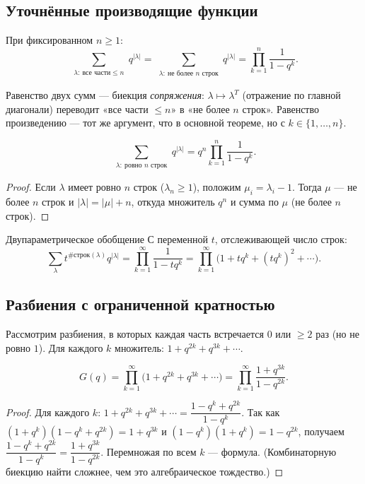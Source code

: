\subsection{Уточнённые производящие функции}

\begin{Theorem}{}{}
	При фиксированном $n\ge 1$:
	\[
	\sum_{\substack{\lambda:\ \text{все части}\le n}}q^{|\lambda|}
	=\sum_{\substack{\lambda:\ \text{не более }n\text{ строк}}}q^{|\lambda|}
	=\prod_{k=1}^{n}\frac{1}{1-q^k}.
	\]
\end{Theorem}

Равенство двух сумм — биекция \emph{сопряжения}: $\lambda\mapsto\lambda^{T}$ (отражение по главной диагонали) переводит «все части $\le n$» в «не более $n$ строк». Равенство произведению — тот же аргумент, что в основной теореме, но с $k\in\{1,\dots,n\}$.

\begin{Theorem}{}{}
	\[
	\sum_{\substack{\lambda:\ \text{ровно }n\text{ строк}}}q^{|\lambda|}=q^n\prod_{k=1}^{n}\frac{1}{1-q^k}.
	\]
\end{Theorem}

\begin{proof}
	Если $\lambda$ имеет ровно $n$ строк ($\lambda_n\ge 1$), положим $\mu_i=\lambda_i-1$. Тогда $\mu$ — не более $n$ строк и $|\lambda|=|\mu|+n$, откуда множитель $q^n$ и сумма по $\mu$ (не более $n$ строк).
\end{proof}

\begin{Statement}{Двупараметрическое обобщение}{}
	С переменной $t$, отслеживающей число строк:
	\[
	\sum_{\lambda}t^{\#\mathrm{строк}(\lambda)}q^{|\lambda|}=\prod_{k=1}^{\infty}\frac{1}{1-tq^k}=\prod_{k=1}^{\infty}\bigl(1+tq^k+(tq^k)^2+\cdots\bigr).
	\]
\end{Statement}

\subsection{Разбиения с ограниченной кратностью}

Рассмотрим разбиения, в которых каждая часть встречается $0$ или $\ge 2$ раз (но не ровно $1$). Для каждого $k$ множитель: $1+q^{2k}+q^{3k}+\cdots$.

\begin{Theorem}{}{}
	\[
	G(q)=\prod_{k=1}^{\infty}\bigl(1+q^{2k}+q^{3k}+\cdots\bigr)=\prod_{k=1}^{\infty}\frac{1+q^{3k}}{1-q^{2k}}.
	\]
\end{Theorem}

\begin{proof}
	Для каждого $k$: $1+q^{2k}+q^{3k}+\cdots=\dfrac{1-q^k+q^{2k}}{1-q^k}$. Так как $(1+q^k)(1-q^k+q^{2k})=1+q^{3k}$ и $(1-q^k)(1+q^k)=1-q^{2k}$, получаем $\dfrac{1-q^k+q^{2k}}{1-q^k}=\dfrac{1+q^{3k}}{1-q^{2k}}$. Перемножая по всем $k$ — формула. (Комбинаторную биекцию найти сложнее, чем это алгебраическое тождество.)
\end{proof}
